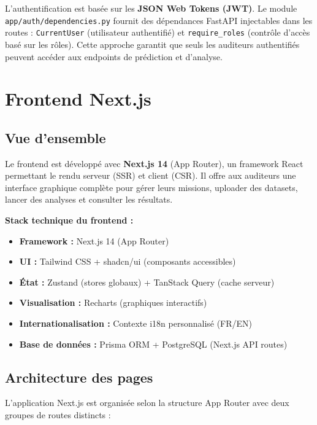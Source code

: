 \documentclass[12pt,a4paper,twoside]{report}
\begin{document}
L'authentification est basée sur les \textbf{JSON Web Tokens (JWT)}. Le module \texttt{app/auth/dependencies.py} fournit des dépendances FastAPI injectables dans les routes : \texttt{CurrentUser} (utilisateur authentifié) et \texttt{require\_roles} (contrôle d'accès basé sur les rôles). Cette approche garantit que seuls les auditeurs authentifiés peuvent accéder aux endpoints de prédiction et d'analyse.

\section{Frontend Next.js}

\subsection{Vue d'ensemble}

Le frontend est développé avec \textbf{Next.js 14} (App Router), un framework React permettant le rendu serveur (SSR) et client (CSR). Il offre aux auditeurs une interface graphique complète pour gérer leurs missions, uploader des datasets, lancer des analyses et consulter les résultats.

\begin{techbox}
\textbf{Stack technique du frontend :}
\begin{itemize}
  \item \textbf{Framework :} Next.js 14 (App Router)
  \item \textbf{UI :} Tailwind CSS + shadcn/ui (composants accessibles)
  \item \textbf{État :} Zustand (stores globaux) + TanStack Query (cache serveur)
  \item \textbf{Visualisation :} Recharts (graphiques interactifs)
  \item \textbf{Internationalisation :} Contexte i18n personnalisé (FR/EN)
  \item \textbf{Base de données :} Prisma ORM + PostgreSQL (Next.js API routes)
\end{itemize}
\end{techbox}

\subsection{Architecture des pages}

L'application Next.js est organisée selon la structure App Router avec deux groupes de routes distincts :
\end{document}
